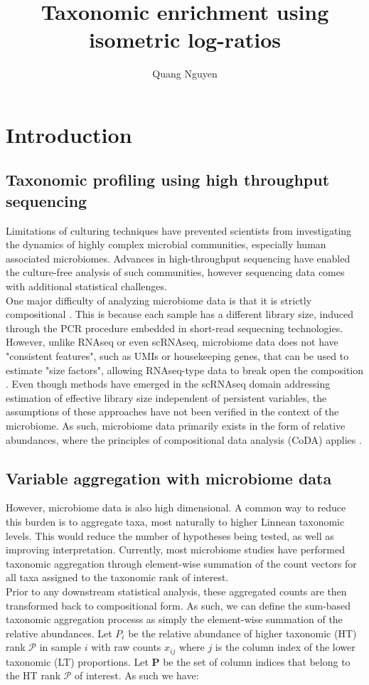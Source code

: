 \documentclass{article}
\title{Taxonomic enrichment using isometric log-ratios}
\author{Quang Nguyen}
\begin{document}
\maketitle

\section{Introduction}
\subsection{Taxonomic profiling using high throughput sequencing}
 Limitations of culturing techniques have prevented scientists from investigating the dynamics of highly complex microbial communities, especially human associated microbiomes. Advances in high-throughput sequencing have enabled the culture-free analysis of such communities, however sequencing data comes with additional statistical challenges. \\
 One major difficulty of analyzing microbiome data is that it is strictly compositional \cite{gloor2017}. This is because each sample has a different library size, induced through the PCR procedure embedded in short-read sequecning technologies. However, unlike RNAseq or even scRNAseq, microbiome data does not have "consistent features", such as UMIs or housekeeping genes, that can be used to estimate "size factors", allowing RNAseq-type data to break open the composition \cite{quinn2018}. Even though methods have emerged in the scRNAseq domain addressing estimation of effective library size independent of persistent variables, the assumptions of these approaches have not been verified in the context of the microbiome. As such, microbiome data primarily exists in the form of relative abundances, where the principles of compositional data analysis (CoDA) applies \cite{aitchison}. 
 \subsection{Variable aggregation with microbiome data} 
 However, microbiome data is also high dimensional. A common way to reduce this burden is to aggregate taxa, most naturally to higher Linnean taxonomic levels. This would reduce the number of hypotheses being tested, as well as improving interpretation. Currently, most microbiome studies have performed taxonomic aggregation through element-wise summation of the count vectors for all taxa assigned to the taxonomic rank of interest. \\ 
 Prior to any downstream statistical analysis, these aggregated counts are then transformed back to compositional form. As such, we can define the sum-based taxonomic aggregation processs as simply the element-wise summation of the relative abundances. Let $P_{i}$ be the relative abundance of higher taxonomic (HT) rank $\mathcal{P}$ in sample $i$ with raw counts $x_{ij}$ where $j$ is the column index of the lower taxonomic (LT) proportions. Let $\bm{P}$ be the set of column indices that belong to the HT rank $\mathcal{P}$ of interest. As such we have:    
\end{document}
